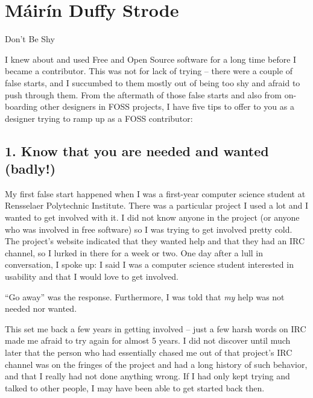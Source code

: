 
\chapter{Máirín Duffy Strode}{Don't Be Shy}

I knew about and used Free and Open Source software for a long time before I
became a contributor. This was not for lack of trying -- there were a couple of
false starts, and I succumbed to them mostly out of being too shy and afraid to
push through them. From the aftermath of those false starts and also from
on-boarding other designers in FOSS projects, I have five tips to offer to you
as a designer trying to ramp up as a FOSS contributor:

\section*{1. Know that you are needed and wanted (badly!)}

My first false start happened when I was a first-year computer science student
at Rensselaer Polytechnic Institute. There was a particular project I used a lot
and I wanted to get involved with it. I did not know anyone in the project (or
anyone who was involved in free software) so I was trying to get involved pretty
cold. The project's website indicated that they wanted help and that they had an
IRC channel, so I lurked in there for a week or two. One day after a lull in
conversation, I spoke up: I said I was a computer science student interested in
usability and that I would love to get involved.

``Go away'' was the response. Furthermore, I was told that \emph{my} help was not
needed nor wanted. 

This set me back a few years in getting involved -- just a few harsh words on IRC
made me afraid to try again for almost 5 years.  I did not discover until much
later that the person who had essentially chased me out of that project's IRC
channel was on the fringes of the project and had a long history of such
behavior, and that I really had not done anything wrong. If I had only kept
trying and talked to other people, I may have been able to get started back
then.

